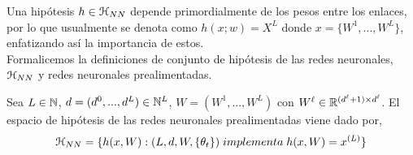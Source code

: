     Una hipótesis $h \in \mathcal{H}_{NN}$ depende primordialmente de los pesos entre los enlaces, por lo que usualmente se denota como $h(x;w) = X^L$ donde $x = \{W^1,...,W^L\}$, enfatizando así la importancia de estos. \\
    
    Formalicemos la definiciones de conjunto de hipótesis de las redes neuronales, $\mathcal{H}_{NN}$ y redes neuronales prealimentadas. \\
    
    \begin{definicion}
    Sea $L \in \mathbb{N}$, $d =(d^0,...,d^L) \in \mathbb{N}^L$, $W=(W^1,...,W^L)$ con $W^{\ell} \in \mathbb{R}^{(d^{\ell} + 1)\times d^{\ell}}$. El espacio de hipótesis de las redes neuronales prealimentadas viene dado por,
    \begin{equation}
        \mathcal{H}_{NN} = \{ h(x,W) : (L,d,W,\{\theta_t\}) \; implementa  \; h(x,W) = x^{(L)} \}
    \end{equation}
    \end{definicion}

